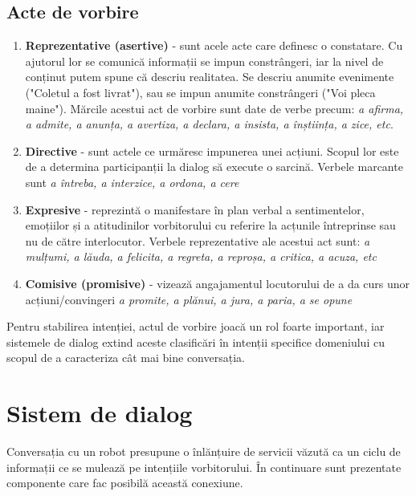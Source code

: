 \subsection{Acte de vorbire}
\begin{enumerate}
	\item \textbf{Reprezentative (asertive)} - sunt acele acte care definesc o constatare. Cu ajutorul lor se comunică informații se impun constrângeri, iar la nivel de conținut putem spune că descriu realitatea. Se descriu anumite evenimente ("Coletul a fost livrat"), sau se impun anumite constrângeri ("Voi pleca maine"). Mărcile acestui act de vorbire sunt date de verbe precum: \textit{a afirma, a admite, a anunța, a avertiza, a declara, a insista, a înștiința, a zice, etc}.

	\item \textbf{Directive} - sunt actele ce urmăresc impunerea unei acțiuni. Scopul lor este de a determina participanții la dialog să execute o sarcină. Verbele marcante sunt \textit{a întreba, a interzice, a ordona, a cere}
	
	\item \textbf{Expresive} -  reprezintă o manifestare în plan verbal a sentimentelor, emoțiilor și a atitudinilor vorbitorului cu referire la acțunile întreprinse sau nu de către interlocutor. Verbele reprezentative ale acestui act sunt: \textit{a mulțumi, a lăuda, a felicita, a regreta, a reproșa, a critica, a acuza, etc}
	
	\item \textbf{Comisive (promisive)} - vizează angajamentul locutorului de a da curs unor acțiuni/convingeri \textit{a promite, a plănui, a jura, a paria, a se opune}
\end{enumerate}

Pentru stabilirea intenției, actul de vorbire joacă un rol foarte important, iar sistemele de dialog extind aceste clasificări în intenții specifice domeniului cu scopul de a caracteriza cât mai bine conversația.


\section{Sistem de dialog}
Conversația cu un robot presupune o înlănțuire de servicii văzută ca un ciclu de informații ce se mulează pe intențiile vorbitorului. În continuare sunt prezentate componente care fac posibilă această conexiune.
